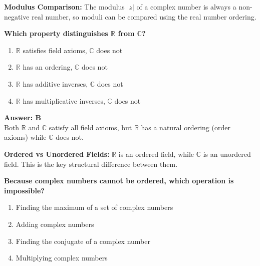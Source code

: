 \documentclass[12pt,a4paper]{article}
\begin{document}
\begin{conceptbox}
\textbf{Modulus Comparison:} The modulus \( |z| \) of a complex number is always a non-negative real number, so moduli can be compared using the real number ordering.
\end{conceptbox}

\newpage
\begin{questiontitle}[MCQ 71]
\textbf{Which property distinguishes \( \mathbb{R} \) from \( \mathbb{C} \)?}
\end{questiontitle}

\begin{partbox}[Options]
\begin{enumerate}[label=\Alph*.]
    \item \( \mathbb{R} \) satisfies field axioms, \( \mathbb{C} \) does not
    \item \( \mathbb{R} \) has an ordering, \( \mathbb{C} \) does not
    \item \( \mathbb{R} \) has additive inverses, \( \mathbb{C} \) does not
    \item \( \mathbb{R} \) has multiplicative inverses, \( \mathbb{C} \) does not
\end{enumerate}
\end{partbox}

\begin{answerstyle}
\textbf{Answer: B} \\
Both \( \mathbb{R} \) and \( \mathbb{C} \) satisfy all field axioms, but \( \mathbb{R} \) has a natural ordering (order axioms) while \( \mathbb{C} \) does not.
\end{answerstyle}

\begin{conceptbox}
\textbf{Ordered vs Unordered Fields:} \( \mathbb{R} \) is an ordered field, while \( \mathbb{C} \) is an unordered field. This is the key structural difference between them.
\end{conceptbox}

\newpage
\begin{questiontitle}[MCQ 72]
\textbf{Because complex numbers cannot be ordered, which operation is impossible?}
\end{questiontitle}

\begin{partbox}[Options]
\begin{enumerate}[label=\Alph*.]
    \item Finding the maximum of a set of complex numbers
    \item Adding complex numbers
    \item Finding the conjugate of a complex number
    \item Multiplying complex numbers
\end{enumerate}
\end{partbox}
\end{document}
